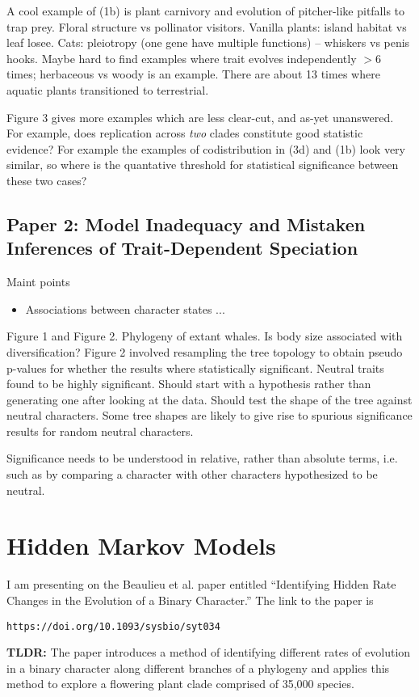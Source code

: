 \documentclass{article}
\begin{document}
A cool example of (1b) is plant carnivory and evolution of pitcher-like pitfalls
to trap prey. Floral structure vs pollinator visitors. Vanilla plants: island
habitat vs leaf losee. Cats: pleiotropy (one gene have multiple functions) --
whiskers vs penis hooks. Maybe hard to find examples where trait evolves
independently $>6$ times; herbaceous vs woody is an example. There are about
13 times where aquatic plants transitioned to terrestrial.

Figure 3 gives more examples which are less clear-cut, and as-yet unanswered.
For example, does replication across \textit{two} clades constitute good
statistic evidence? For example the examples of codistribution in (3d) and (1b)
look very similar, so where is the quantative threshold for statistical significance
between these two cases?

\subsection{Paper 2: Model Inadequacy and Mistaken Inferences of Trait-Dependent Speciation}

Maint points
\begin{itemize}
  \item Associations between character states ...
\end{itemize}

Figure 1 and Figure 2. Phylogeny of extant whales. Is body size associated with
diversification? Figure 2 involved resampling the tree topology to obtain pseudo
p-values for whether the results where statistically significant. Neutral traits
found to be highly significant. Should start with a hypothesis rather than
generating one after looking at the data. Should test the shape of the tree
against neutral characters. Some tree shapes are likely to give rise to spurious
significance results for random neutral characters.

Significance needs to be understood in relative, rather than absolute terms,
i.e. such as by comparing a character with other characters hypothesized to be neutral. 


\section{Hidden Markov Models}

I am presenting on the Beaulieu et al. paper entitled ``Identifying Hidden Rate
Changes in the Evolution of a Binary Character.'' The link to the paper is
\begin{verbatim}
https://doi.org/10.1093/sysbio/syt034
\end{verbatim}
\textbf{TLDR:} The paper introduces a method of identifying different rates of
evolution in a binary character along different branches of a phylogeny and
applies this method to explore a flowering plant clade comprised of 35,000
species.
\end{document}
